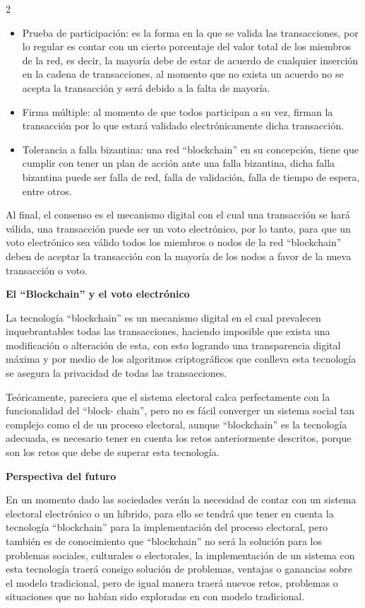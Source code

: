 \documentclass[12pt,spanish,Letterpaper,openany]{book}
\begin{document}
\begin {multicols}{2}
\begin{itemize}
\item
  Prueba de participación: es la forma en la que se valida las transacciones, por lo regular es contar con un cierto porcentaje del valor total de los miembros de la red, es decir, la mayoría debe de estar de acuerdo de cualquier inserción en la cadena de transacciones, al momento que no exista un acuerdo no se acepta la transacción y será debido a la falta de mayoría.
\item
  Firma múltiple: al momento de que todos participan a su vez, firman la transacción por lo que estará validado electrónicamente dicha transacción.
\item
  Tolerancia a falla bizantina: una red ``blockchain'' en su concepción, tiene que cumplir con tener un plan de acción ante una falla bizantina, dicha falla bizantina puede ser falla de red, falla de validación, falla de tiempo de espera, entre otros.
\end{itemize}

Al final, el consenso es el mecanismo digital con el cual una transacción se hará válida, una transacción puede ser un voto electrónico, por lo tanto, para que un voto electrónico sea válido todos los miembros o nodos de la red ``blockchain'' deben de aceptar la transacción con la mayoría de los nodos a favor de la nueva transacción o voto.

\textbf{El ``Blockchain'' y el voto electrónico}

La tecnología ``blockchain'' es un mecanismo digital en el cual prevalecen inquebrantables todas las transacciones, haciendo imposible que exista una modificación o alteración de esta, con esto logrando una transparencia digital máxima y por medio de los algoritmos criptográficos que conlleva esta tecnología se asegura la privacidad de todas las transacciones.

Teóricamente, pareciera que el sistema electoral calca perfectamente con la funcionalidad del ``block-
chain'', pero no es fácil converger un sistema social tan complejo como el de un proceso electoral, aunque ``blockchain'' es la tecnología adecuada, es necesario tener en cuenta los retos anteriormente descritos, porque son los retos que debe de superar esta tecnología.

\textbf{Perspectiva del futuro}

En un momento dado las sociedades verán la necesidad de contar con un sistema electoral electrónico o un híbrido, para ello se tendrá que tener en cuenta la tecnología ``blockchain'' para la implementación del proceso electoral, pero también es de conocimiento que ``blockchain'' no será la solución para los problemas sociales, culturales o electorales, la implementación de un sistema con esta tecnología traerá consigo solución de problemas, ventajas o ganancias sobre el modelo tradicional, pero de igual manera traerá nuevos retos, problemas o situaciones que no habían sido exploradas en con modelo tradicional.


\end{multicols}
\end{document}
